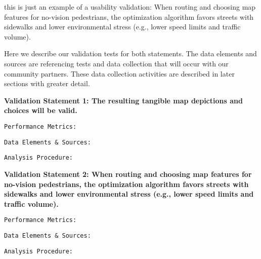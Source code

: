 \ac{this is just an example of a usability validation:}
When routing and choosing map features for no-vision pedestrians, the optimization algorithm favors streets with sidewalks and lower environmental stress (e.g., lower speed limits and traffic volume).

Here we describe our validation tests for both statements. The data elements and sources are referencing tests and data collection that will occur with our community partners. These data collection activities are described in later sections with greater detail.

\textbf{Validation Statement 1:
The resulting tangible map depictions and choices will be valid.}

\texttt{Performance Metrics:} 

\texttt{Data Elements \& Sources:}

\texttt{Analysis Procedure:}

\textbf{Validation Statement 2:
When routing and choosing map features for no-vision pedestrians, the optimization algorithm favors streets with sidewalks and lower environmental stress (e.g., lower speed limits and traffic volume).
}


\texttt{Performance Metrics:} 

\texttt{Data Elements \& Sources:}

\texttt{Analysis Procedure:}